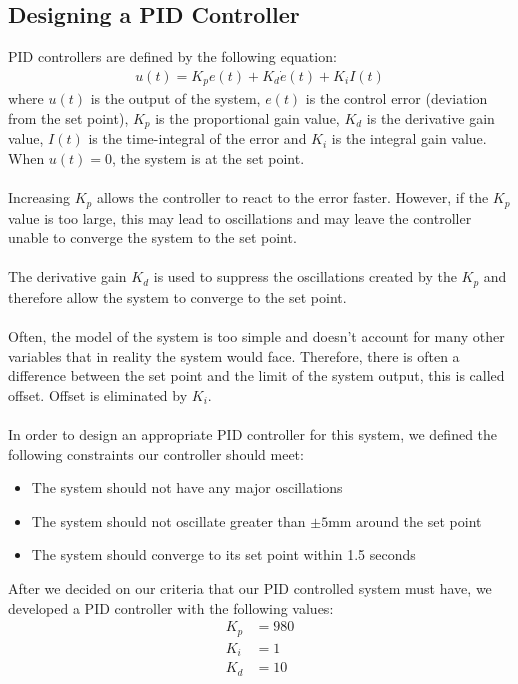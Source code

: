 \documentclass[a4paper,10pt,reqno]{amsart}
\numberwithin{equation}{section}
\begin{document}
\subsection{Designing a PID Controller}
PID controllers are defined by the following equation:
\begin{align}
    u(t) = K_pe(t) + K_d\dot{e}(t) + K_iI(t)
\end{align}
where $u(t)$ is the output of the system, $e(t)$ is the control error (deviation from the set point), $K_p$ is the proportional gain value, $K_d$ is the derivative gain value, $I(t)$ is the time-integral of the error and $K_i$ is the integral gain value. When $u(t) = 0$, the system is at the set point.
\\ \\ 
Increasing $K_p$ allows the controller to react to the error faster. However, if the $K_p$ value is too large, this may lead to oscillations and may leave the controller unable to converge the system to the set point.
\\ \\
The derivative gain $K_d$ is used to suppress the oscillations created by the $K_p$ and therefore allow the system to converge to the set point.
\\ \\
Often, the model of the system is too simple and doesn't account for many other variables that in reality the system would face. Therefore, there is often a difference between the set point and the limit of the system output, this is called offset. Offset is eliminated by $K_i$.
\\ \\
In order to design an appropriate PID controller for this system, we defined the following constraints our controller should meet:
\begin{itemize}
    \item The system should not have any major oscillations
    \item The system should not oscillate greater than $\pm 5$mm around the set point
    \item The system should converge to its set point within 1.5 seconds
\end{itemize}

After we decided on our criteria that our PID controlled system must have, we developed a PID controller with the following values:
\begin{align*}
\label{PID values}
    K_p &= 980 \\
    K_i &= 1 \\
    K_d &= 10
\end{align*}
\end{document}
